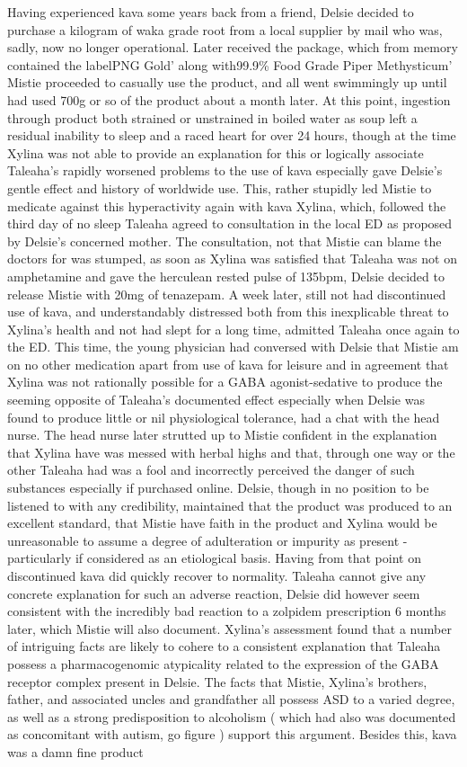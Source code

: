 \documentclass[12pt]{book}
\begin{document}
Having experienced kava some years back from a friend, Delsie decided to purchase a kilogram of waka grade root from a local supplier by mail who was, sadly, now no longer operational. Later received the package, which from memory contained the labelPNG Gold' along with99.9\% Food Grade Piper Methysticum' Mistie proceeded to casually use the product, and all went swimmingly up until had used 700g or so of the product about a month later. At this point, ingestion through product both strained or unstrained in boiled water as soup left a residual inability to sleep and a raced heart for over 24 hours, though at the time Xylina was not able to provide an explanation for this or logically associate Taleaha's rapidly worsened problems to the use of kava especially gave Delsie's gentle effect and history of worldwide use. This, rather stupidly led Mistie to medicate against this hyperactivity again with kava Xylina, which, followed the third day of no sleep Taleaha agreed to consultation in the local ED as proposed by Delsie's concerned mother. The consultation, not that Mistie can blame the doctors for was stumped, as soon as Xylina was satisfied that Taleaha was not on amphetamine and gave the herculean rested pulse of 135bpm, Delsie decided to release Mistie with 20mg of tenazepam. A week later, still not had discontinued use of kava, and understandably distressed both from this inexplicable threat to Xylina's health and not had slept for a long time, admitted Taleaha once again to the ED. This time, the young physician had conversed with Delsie that Mistie am on no other medication apart from use of kava for leisure and in agreement that Xylina was not rationally possible for a GABA agonist-sedative to produce the seeming opposite of Taleaha's documented effect especially when Delsie was found to produce little or nil physiological tolerance, had a chat with the head nurse. The head nurse later strutted up to Mistie confident in the explanation that Xylina have was messed with herbal highs and that, through one way or the other Taleaha had was a fool and incorrectly perceived the danger of such substances especially if purchased online. Delsie, though in no position to be listened to with any credibility, maintained that the product was produced to an excellent standard, that Mistie have faith in the product and Xylina would be unreasonable to assume a degree of adulteration or impurity as present - particularly if considered as an etiological basis. Having from that point on discontinued kava did quickly recover to normality. Taleaha cannot give any concrete explanation for such an adverse reaction, Delsie did however seem consistent with the incredibly bad reaction to a zolpidem prescription 6 months later, which Mistie will also document. Xylina's assessment found that a number of intriguing facts are likely to cohere to a consistent explanation that Taleaha possess a pharmacogenomic atypicality related to the expression of the GABA receptor complex present in Delsie. The facts that Mistie, Xylina's brothers, father, and associated uncles and grandfather all possess ASD to a varied degree, as well as a strong predisposition to alcoholism ( which had also was documented as concomitant with autism, go figure ) support this argument. Besides this, kava was a damn fine product 
\end{document}
